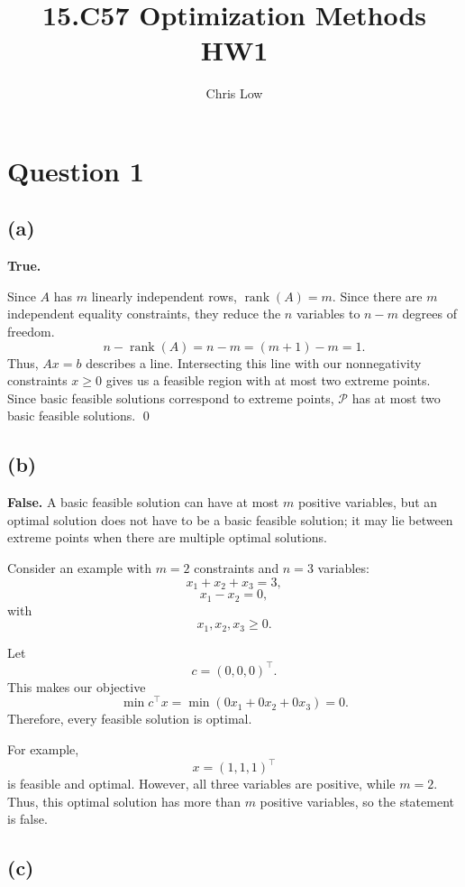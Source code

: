 \documentclass{article}
\title{15.C57 Optimization Methods HW1}
\author{Chris Low}
\date{} %
\begin{document}
\maketitle

\section*{Question 1}

\subsection*{(a)}
\textbf{True.}

Since $A$ has $m$ linearly independent rows, $\operatorname{rank}(A)=m$.
Since there are \(m\) independent equality constraints, they reduce the \(n\) variables to \(n-m\) degrees of freedom.
\[
n-\operatorname{rank}(A)=n-m=(m+1)-m=1.
\]
Thus, $Ax=b$ describes a line. Intersecting this line with our
nonnegativity constraints $x\geq 0$ gives us a feasible region with at most
two extreme points. Since basic feasible solutions correspond to extreme
points, $\mathcal{P}$ has at most two basic feasible solutions. \qed 



\vspace{5mm}
\subsection*{(b)}

\textbf{False.}
A basic feasible solution can have at most $m$ positive variables, but an optimal solution does not have to be a basic feasible solution; it may lie between extreme points when there are multiple optimal solutions.

Consider an example with $m=2$ constraints and $n=3$ variables:
\[
x_1+x_2+x_3=3,
\]
\[
x_1-x_2=0,
\]
with
\[
x_1,x_2,x_3\geq 0.
\]

Let
\[
c=(0,0,0)^\top.
\]
This makes our objective
\[
\min c^\top x
=
\min (0x_1+0x_2+0x_3)
=
0.
\]
Therefore, every feasible solution is optimal.

For example, 
\[
x=(1,1,1)^\top
\]
is feasible and optimal. However, all three variables are positive, while
$m=2$. Thus, this optimal solution has more than $m$ positive variables,
so the statement is false.

\vspace{5mm}

\subsection*{(c)}
\end{document}
